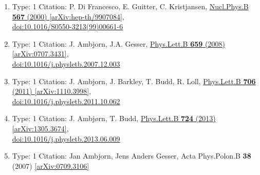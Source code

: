 \documentclass[a4paper,10pt]{article}
\begin{document}
\begin{enumerate}
\begin{enumerate}
  \item Type: 1 Citation: P. Di Francesco, E. Guitter, C. Kristjansen, \href{https://www.doi.org/10.1016/S0550-3213(99)00661-6}{Nucl.Phys.B {\bf 567} (2000) }  \href{https://arxiv.org/abs/hep-th/9907084}{[arXiv:hep-th/9907084]},\\\href{https://www.doi.org/10.1016/S0550-3213(99)00661-6}{doi:10.1016/S0550-3213(99)00661-6}
  \item Type: 1 Citation: J. Ambjorn, J.A. Gesser, \href{https://www.doi.org/10.1016/j.physletb.2007.12.003}{Phys.Lett.B {\bf 659} (2008) }  \href{https://arxiv.org/abs/0707.3431}{[arXiv:0707.3431]},\\\href{https://www.doi.org/10.1016/j.physletb.2007.12.003}{doi:10.1016/j.physletb.2007.12.003}
  \item Type: 1 Citation: J. Ambjorn, J. Barkley, T. Budd, R. Loll, \href{https://www.doi.org/10.1016/j.physletb.2011.10.062}{Phys.Lett.B {\bf 706} (2011) }  \href{https://arxiv.org/abs/1110.3998}{[arXiv:1110.3998]},\\\href{https://www.doi.org/10.1016/j.physletb.2011.10.062}{doi:10.1016/j.physletb.2011.10.062}
  \item Type: 1 Citation: J. Ambjørn, T. Budd, \href{https://www.doi.org/10.1016/j.physletb.2013.06.009}{Phys.Lett.B {\bf 724} (2013) }  \href{https://arxiv.org/abs/1305.3674}{[arXiv:1305.3674]},\\\href{https://www.doi.org/10.1016/j.physletb.2013.06.009}{doi:10.1016/j.physletb.2013.06.009}
  \item Type: 1 Citation: Jan Ambjorn, Jens Anders Gesser, Acta Phys.Polon.B {\bf 38} (2007)   \href{https://arxiv.org/abs/0709.3106}{[arXiv:0709.3106]}

\end{enumerate}
\end{enumerate}
\end{document}
